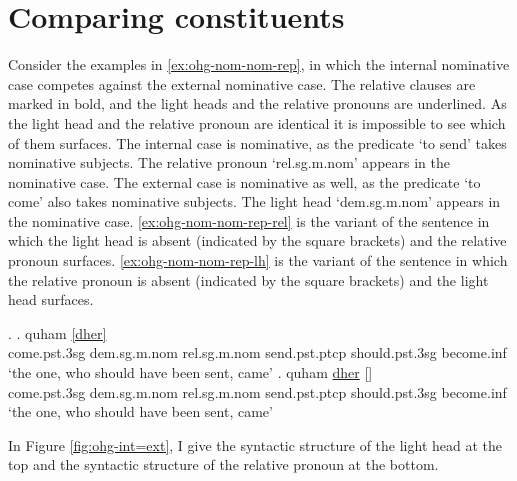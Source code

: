 \section{Comparing constituents}\label{sec:comparing-ohg}

Consider the examples in \ref{ex:ohg-nom-nom-rep}, in which the internal nominative case competes against the external nominative case. The relative clauses are marked in bold, and the light heads and the relative pronouns are underlined. As the light head and the relative pronoun are identical it is impossible to see which of them surfaces.
The internal case is nominative, as the predicate  `to send' takes nominative subjects. The relative pronoun  `\ac{rel}.\ac{sg}.\ac{m}.\ac{nom}' appears in the nominative case.
The external case is nominative as well, as the predicate  `to come' also takes nominative subjects. The light head  `\ac{dem}.\ac{sg}.\ac{m}.\ac{nom}' appears in the nominative case.
\ref{ex:ohg-nom-nom-rep-rel} is the variant of the sentence in which the light head is absent (indicated by the square brackets) and the relative pronoun surfaces.
\ref{ex:ohg-nom-nom-rep-lh} is the variant of the sentence in which the relative pronoun is absent (indicated by the square brackets) and the light head surfaces.

\ex.\label{ex:ohg-nom-nom-rep}
\ag. quham \underline{[dher]}  \underline{}  \\
 come.\ac{pst}.3\ac{sg}\scsub{[nom]} \ac{dem}.\ac{sg}.\ac{m}.\ac{nom} \ac{rel}.\ac{sg}.\ac{m}.\ac{nom} send.\ac{pst}.\ac{ptcp}\scsub{[nom]} should.\ac{pst}.3\ac{sg} become.\ac{inf}\\
 `the one, who should have been sent, came' \label{ex:ohg-nom-nom-rep-rel}
\bg. quham \underline{dher} [] \underline{}  \\
 come.\ac{pst}.3\ac{sg}\scsub{[nom]} \ac{dem}.\ac{sg}.\ac{m}.\ac{nom} \ac{rel}.\ac{sg}.\ac{m}.\ac{nom} send.\ac{pst}.\ac{ptcp}\scsub{[nom]} should.\ac{pst}.3\ac{sg} become.\ac{inf}\\
 `the one, who should have been sent, came' \label{ex:ohg-nom-nom-rep-lh}

In Figure \ref{fig:ohg-int=ext}, I give the syntactic structure of the light head at the top and the syntactic structure of the relative pronoun at the bottom.

